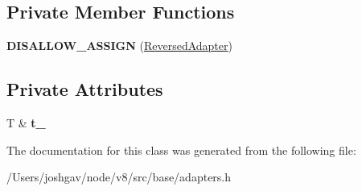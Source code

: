 \subsection*{Private Member Functions}
\begin{DoxyCompactItemize}
\item 
{\bfseries D\+I\+S\+A\+L\+L\+O\+W\+\_\+\+A\+S\+S\+I\+GN} (\hyperlink{classv8_1_1base_1_1_reversed_adapter}{Reversed\+Adapter})\hypertarget{classv8_1_1base_1_1_reversed_adapter_a79c560acbec624c305dbe1919b159cbf}{}\label{classv8_1_1base_1_1_reversed_adapter_a79c560acbec624c305dbe1919b159cbf}

\end{DoxyCompactItemize}
\subsection*{Private Attributes}
\begin{DoxyCompactItemize}
\item 
T \& {\bfseries t\+\_\+}\hypertarget{classv8_1_1base_1_1_reversed_adapter_a2f47a096661ecc57e846925920e7cab6}{}\label{classv8_1_1base_1_1_reversed_adapter_a2f47a096661ecc57e846925920e7cab6}

\end{DoxyCompactItemize}


The documentation for this class was generated from the following file\+:\begin{DoxyCompactItemize}
\item 
/\+Users/joshgav/node/v8/src/base/adapters.\+h\end{DoxyCompactItemize}
